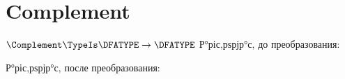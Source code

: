 \section{Complement}
\begin{frame}{$\Complement\TypeIs\DFATYPE\to\DFATYPE$}
	Р°ріс‚рѕрјр°с‚ до преобразования:

	Р°ріс‚рѕрјр°с‚ после преобразования:
\end{frame}